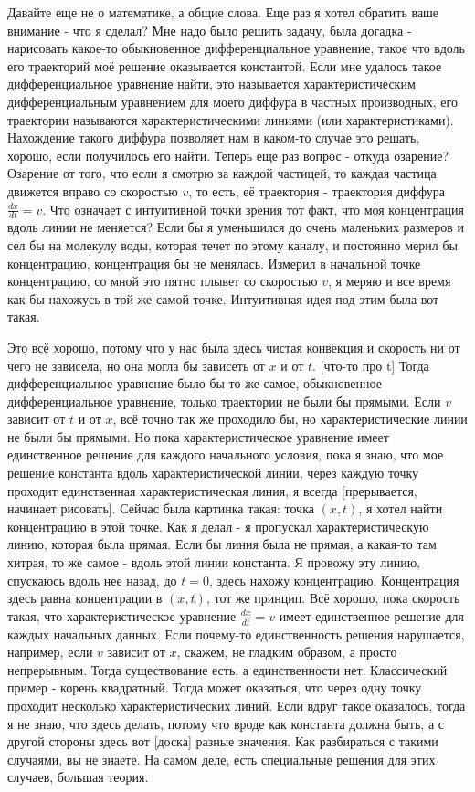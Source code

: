 Давайте еще не о математике, а общие слова. Еще раз я хотел обратить ваше внимание - что я сделал? 
Мне надо было решить задачу, была догадка - нарисовать какое-то обыкновенное дифференциальное уравнение, 
такое что вдоль его траекторий моё решение оказывается константой. Если мне удалось такое дифференциальное 
уравнение найти, это называется характеристическим дифференциальным уравнением для моего диффура в частных 
производных, его траектории называются характеристическими линиями (или характеристиками). Нахождение такого 
диффура позволяет нам в каком-то случае это решать, хорошо, если получилось его найти. Теперь еще раз вопрос - 
откуда озарение? Озарение от того, что если я смотрю за каждой частицей, то каждая частица движется вправо со 
скоростью $v$, то есть, её траектория - траектория диффура $\frac{dx}{dt} = v$. Что означает с интуитивной 
точки зрения тот факт, что моя концентрация вдоль линии не меняется? Если бы я уменьшился до очень маленьких 
размеров и сел бы на молекулу воды, которая течет по этому каналу, и постоянно мерил бы концентрацию, 
концентрация бы не менялась. Измерил в начальной точке концентрацию, со мной это пятно плывет со скоростью $v$,
я меряю и все время как бы нахожусь в той же самой точке. Интуитивная идея под этим была вот такая.

Это всё хорошо, потому что у нас была здесь чистая конвекция и скорость ни от чего не зависела, но она могла бы
зависеть от $x$ и от $t$. [что-то про t] Тогда дифференциальное уравнение было бы то же самое, обыкновенное
дифференциальное уравнение, только траектории не были бы прямыми. Если $v$ зависит от $t$ и от $x$, всё точно
так же проходило бы, но характеристические линии не были бы прямыми. Но пока характеристическое уравнение имеет
единственное решение для каждого начального условия, пока я знаю, что мое решение константа вдоль
характеристической линии, через каждую точку проходит единственная характеристическая линия, я всегда
[прерывается, начинает рисовать]. Сейчас была картинка такая: точка $(x, t)$, я хотел найти концентрацию в этой
точке. Как я делал - я пропускал характеристическую линию, которая была прямая. Если бы линия была не прямая, а
какая-то там хитрая, то же самое - вдоль этой линии константа. Я провожу эту линию, спускаюсь вдоль нее назад,
до $t = 0$, здесь нахожу концентрацию. Концентрация здесь равна концентрации в $(x, t)$, тот же принцип. Всё
хорошо, пока скорость такая, что характеристическое уравнение $\frac{dx}{dt} = v$ имеет единственное решение
для каждых начальных данных. Если почему-то единственность решения нарушается, например, если $v$ зависит от
$x$, скажем, не гладким образом, а просто непрерывным. Тогда существование есть, а единственности нет.
Классический пример - корень квадратный. Тогда может оказаться, что через одну точку проходит несколько
характеристических линий. Если вдруг такое оказалось, тогда я не знаю, что здесь делать, потому что вроде как
константа должна быть, а с другой стороны здесь вот [доска] разные значения. Как разбираться с такими случаями,
вы не знаете. На самом деле, есть специальные решения для этих случаев, большая теория.

